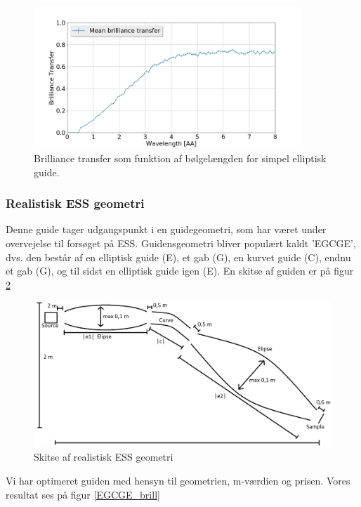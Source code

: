 \documentclass[12pt,oneside,a4paper]{article}
\begin{document}
{{{{{\begin{figure}[H]
\centering
\includegraphics[width=0.9\textwidth]{optimized_mean_4.png}
\caption{Brilliance transfer som funktion af bølgelængden for simpel elliptisk guide.} \label{simpel_guide}
\end{figure}




\subsubsection{Realistisk ESS geometri}
Denne guide tager udgangspunkt i en guidegeometri, som har været under overvejelse til forsøget på ESS. Guidensgeometri bliver populært kaldt 'EGCGE', dvs. den består af en elliptisk guide (E), et gab (G), en kurvet guide (C), endnu et gab (G), og til sidst en elliptisk guide igen (E). En skitse af guiden er på figur \ref{EGCGE}

\begin{figure}[H]
\centering
\includegraphics[width=1\textwidth]{EGCGE.png}
\caption{Skitse af realistisk ESS geometri} \label{EGCGE}
\end{figure}

Vi har optimeret guiden med hensyn til geometrien, m-værdien og prisen. Vores resultat ses på figur \ref{EGCGE_brill}

}}}}}
\end{document}
